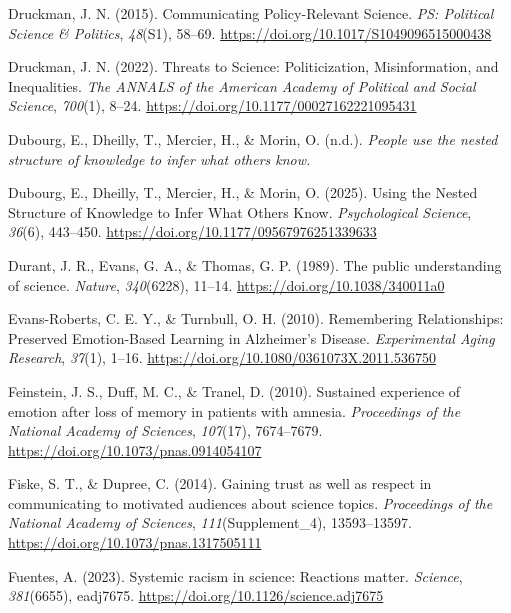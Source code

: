 \documentclass[
  jou,
  floatsintext,
  longtable,
  nolmodern,
  notxfonts,
  notimes,
  colorlinks=true,linkcolor=blue,citecolor=blue,urlcolor=blue]{apa7}
\newlength{\cslhangindent}
\newenvironment{CSLReferences}[2] %
 {\begin{list}{}{%
  \setlength{\itemindent}{0pt}
  \setlength{\leftmargin}{0pt}
  \setlength{\parsep}{0pt}
  \ifodd #1
   \setlength{\leftmargin}{\cslhangindent}
   \setlength{\itemindent}{-1\cslhangindent}
  \fi
  \setlength{\itemsep}{#2\baselineskip}}}
 {\end{list}}
\begin{document}
\begin{CSLReferences}{1}{0}
Druckman, J. N. (2015). Communicating Policy-Relevant Science. \emph{PS:
Political Science \& Politics}, \emph{48}(S1), 58--69.
\url{https://doi.org/10.1017/S1049096515000438}

Druckman, J. N. (2022). Threats to Science: Politicization,
Misinformation, and Inequalities. \emph{The ANNALS of the American
Academy of Political and Social Science}, \emph{700}(1), 8--24.
\url{https://doi.org/10.1177/00027162221095431}

Dubourg, E., Dheilly, T., Mercier, H., \& Morin, O. (n.d.). \emph{People
use the nested structure of knowledge to infer what others know.}

Dubourg, E., Dheilly, T., Mercier, H., \& Morin, O. (2025). Using the
Nested Structure of Knowledge to Infer What Others Know.
\emph{Psychological Science}, \emph{36}(6), 443--450.
\url{https://doi.org/10.1177/09567976251339633}

Durant, J. R., Evans, G. A., \& Thomas, G. P. (1989). The public
understanding of science. \emph{Nature}, \emph{340}(6228), 11--14.
\url{https://doi.org/10.1038/340011a0}

Evans-Roberts, C. E. Y., \& Turnbull, O. H. (2010). Remembering
Relationships: Preserved Emotion-Based Learning in Alzheimer's Disease.
\emph{Experimental Aging Research}, \emph{37}(1), 1--16.
\url{https://doi.org/10.1080/0361073X.2011.536750}

Feinstein, J. S., Duff, M. C., \& Tranel, D. (2010). Sustained
experience of emotion after loss of memory in patients with amnesia.
\emph{Proceedings of the National Academy of Sciences}, \emph{107}(17),
7674--7679. \url{https://doi.org/10.1073/pnas.0914054107}

Fiske, S. T., \& Dupree, C. (2014). Gaining trust as well as respect in
communicating to motivated audiences about science topics.
\emph{Proceedings of the National Academy of Sciences},
\emph{111}(Supplement{\_}4), 13593--13597.
\url{https://doi.org/10.1073/pnas.1317505111}

Fuentes, A. (2023). Systemic racism in science: Reactions matter.
\emph{Science}, \emph{381}(6655), eadj7675.
\url{https://doi.org/10.1126/science.adj7675}


\end{CSLReferences}
\end{document}
